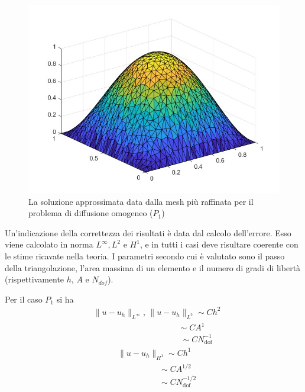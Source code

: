 \documentclass[%
	corpo=11pt,
    twoside,
    stile=classica,
    oldstyle,
    tipotesi=custom,
    greek,
    evenboxes,
]{toptesi}
\begin{document}
    
\begin{figure}[htbp]
    \centering
    
    \includegraphics[scale=0.4]{Pictures/grafico_p1_2allameno10_omog.jpg}
    \caption{La soluzione approssimata data dalla mesh più raffinata per il problema di diffusione omogeneo ($P_1$)}
    \label{fig:soluzione_p1_omog}
  
\end{figure}


Un'indicazione della correttezza dei risultati è data dal calcolo dell'errore. Esso viene calcolato in norma $L^{\infty}, L^2$ e $H^1$, e in tutti i casi deve risultare coerente con le stime ricavate nella teoria. I parametri secondo cui è valutato sono il passo della triangolazione, l'area massima di un elemento e il numero di gradi di libertà (rispettivamente $h$, $A$ e $N_{dof}$).

Per il caso $P_1$ si ha
\begin{align*}
&\|u - u_h\|_{L^\infty},\,\|u - u_h\|_{L^2} \sim Ch^2 \\
&\;\;\;\;\;\;\;\;\;\;\;\;\;\;\;\;\;\;\;\;\;\;\;\;\;\;\;\;\;\;\;\;\;\;\;\;\;\sim CA^1 \\
&\;\;\;\;\;\;\;\;\;\;\;\;\;\;\;\;\;\;\;\;\;\;\;\;\;\;\;\;\;\;\;\;\;\;\;\;\;\;\sim CN_{\text{dof}}^{-1}
\end{align*}
\begin{align*}
&\|u - u_h\|_{H^1} \sim Ch^1 \\
&\;\;\;\;\;\;\;\;\;\;\;\;\;\;\;\;\;\;\sim CA^{1/2} \\
&\;\;\;\;\;\;\;\;\;\;\;\;\;\;\;\;\;\;\sim CN_{\text{dof}}^{-1/2}
\end{align*}
\end{document}
